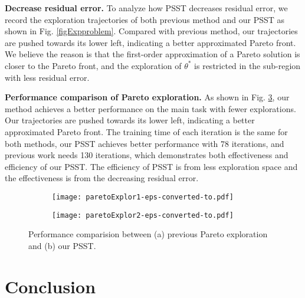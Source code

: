 \documentclass[final]{cvpr}
\begin{document}
\textbf{Decrease residual error.} 
To analyze how PSST decreases residual error, we record the exploration trajectories of both previous method and our PSST as shown in Fig. \ref{figExpproblem}.
Compared with previous method, our trajectories are pushed towards its lower left, indicating a better approximated Pareto front.
We believe the reason is that the first-order approximation of a Pareto solution is closer to the Pareto front, and the 
exploration of $\theta^*$ is restricted in the sub-region with less residual error. 

\textbf{Performance comparison of Pareto exploration.}
As shown in Fig. \ref{figperform}, our method achieves a better performance on the main task with fewer explorations.
Our trajectories are pushed towards its lower left, indicating a better approximated Pareto front.
The training time of each iteration is the same for both methods, our PSST achieves better performance with 78 iterations, and previous work needs 130 iterations,
which demonstrates both effectiveness and efficiency of our PSST.  
The efficiency of PSST is from less exploration space and the effectiveness is from the decreasing residual error.
\begin{figure}
	\begin{subfigure}{0.46\linewidth}
		\texttt{[image: paretoExplor1-eps-converted-to.pdf]}\label{ablation}
		\caption{}
	\end{subfigure}
	\begin{subfigure}{0.46\linewidth}
		\texttt{[image: paretoExplor2-eps-converted-to.pdf]}\label{entropy} 
		\caption{}
	\end{subfigure}
	\caption{Performance comparision between (a) previous Pareto exploration and (b) our PSST.}\label{figperform}
\end{figure}
 

\section{Conclusion}
 
\end{document}
